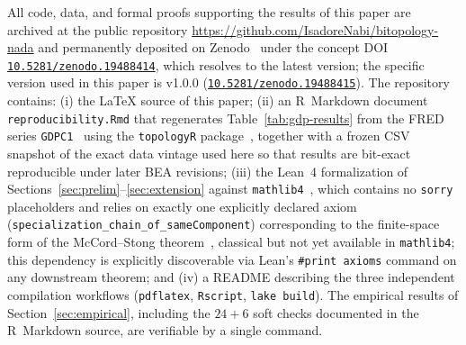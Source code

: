 \documentclass[11pt,a4paper]{article}
\theoremstyle{plain}
\theoremstyle{definition}
\begin{document}
All code, data, and formal proofs supporting the results of this paper
are archived at the public repository
\url{https://github.com/IsadoreNabi/bitopology-nada} and permanently
deposited on Zenodo~\cite{bitopology-nada-zenodo} under the concept DOI
\href{https://doi.org/10.5281/zenodo.19488414}{\texttt{10.5281/zenodo.19488414}},
which resolves to the latest version; the specific version used in
this paper is v1.0.0
(\href{https://doi.org/10.5281/zenodo.19488415}{\texttt{10.5281/zenodo.19488415}}).
The repository contains: (i) the \LaTeX{} source of this paper; (ii) an
R~Markdown document \texttt{reproducibility.Rmd} that regenerates
Table~\ref{tab:gdp-results} from the FRED series \texttt{GDPC1}~\cite{FRED-GDPC1}
using the \texttt{topologyR} package~\cite{topologyR}, together with a
frozen CSV snapshot of the exact data vintage used here so that
results are bit-exact reproducible under later BEA revisions;
(iii) the Lean~4 formalization of
Sections~\ref{sec:prelim}--\ref{sec:extension} against
\texttt{mathlib4}~\cite{mathlib}, which contains no \texttt{sorry}
placeholders and relies on exactly one explicitly declared axiom
(\texttt{specialization\_chain\_of\_sameComponent}) corresponding to the
finite-space form of the McCord--Stong
theorem~\cite{McCord1966,Stong1966}, classical but not yet available in
\texttt{mathlib4}; this dependency is explicitly discoverable via
Lean's \texttt{\#print axioms} command on any downstream theorem; and
(iv) a README describing the three independent compilation workflows
(\texttt{pdflatex}, \texttt{Rscript}, \texttt{lake build}). The
empirical results of Section~\ref{sec:empirical}, including the
$24{+}6$ soft checks documented in the R~Markdown source, are
verifiable by a single command.
\end{document}

